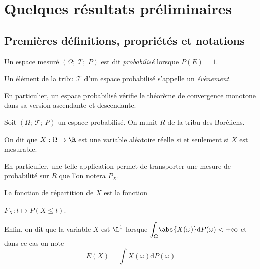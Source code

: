 %
%
%
%

\section{Quelques résultats préliminaires}

\subsection{Premières définitions, propriétés et notations}

\begin{de}
Un espace mesuré $(\Omega;~\mathcal{T};~P)$ est dit \emph{probabilisé} lorsque $P(E) = 1$.

Un élément de la tribu $\mathcal{T}$ d'un espace probabilisé s'appelle un \emph{évènement}.
\end{de}

\begin{prop}
En particulier, un espace probabilisé vérifie le théorème de convergence monotone dans sa version ascendante et descendante.
\end{prop}


\begin{de}
Soit $(\Omega;~\mathcal{T};~P)$ un espace probabilisé. On munit $R$ de la tribu des Boréliens.

On dit que $X: \Omega \to \R$ est une variable aléatoire réelle si et seulement si $X$ est mesurable.

En particulier, une telle application permet de transporter une mesure de probabilité sur $R$ que l'on notera $P_X$.

La fonction de répartition de $X$ est la fonction

$F_X: t \mapsto P(X \leq t)$.

Enfin, on dit que la variable $X$ est $\L^1$ lorsque $\displaystyle{\int_\Omega} \abs{X(\omega)} \mathrm d P(\omega) < +\infty$ et dans ce cas on note 
\[
E(X) = \int X(\omega) \mathrm d P(\omega)
\]
\end{de}

